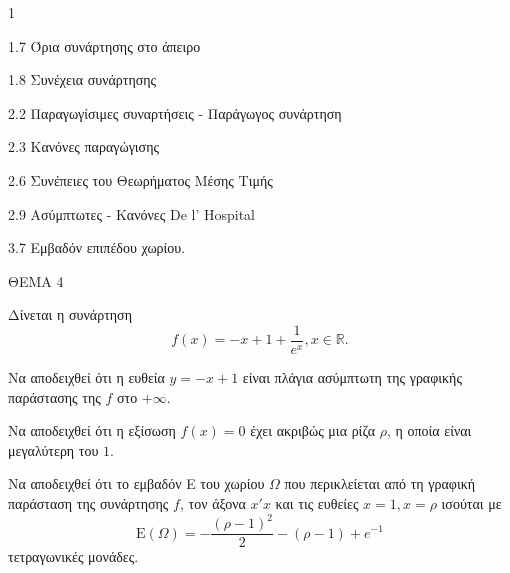 \begin{ylh}{1}
    \item 1.7 Όρια συνάρτησης στο άπειρο
    \item 1.8 Συνέχεια συνάρτησης
    \item 2.2 Παραγωγίσιμες συναρτήσεις - Παράγωγος συνάρτηση
    \item 2.3 Κανόνες παραγώγισης
    \item 2.6 Συνέπειες του Θεωρήματος Μέσης Τιμής
    \item 2.9 Ασύμπτωτες - Κανόνες De l’ Hospital
    \item 3.7 Εμβαδόν επιπέδου χωρίου.
\end{ylh}
ΘΕΜΑ 4

Δίνεται η συνάρτηση
\[ f(x)=-x+1+\frac{1}{e^x}, x \in \mathbb{R}. \]
\begin{alist}
\item Να αποδειχθεί ότι η ευθεία $y=-x+1$ είναι πλάγια ασύμπτωτη της γραφικής παράστασης της $f$ στο $+\infty$. 
\item Να αποδειχθεί ότι η εξίσωση $f(x)=0$ έχει ακριβώς μια ρίζα $\rho$, η οποία είναι μεγαλύτερη του $1$. 
\item Να αποδειχθεί ότι το εμβαδόν E του χωρίου $\Omega$ που περικλείεται από τη γραφική παράσταση της συνάρτησης $f$, τον άξονα $x'x$ και τις ευθείες $x=1, x=\rho$ ισούται με
\[ \text{E}(\Omega)=-\frac{(\rho-1)^2}{2}-(\rho-1)+e^{-1} \]
τετραγωνικές μονάδες. 
\end{alist}